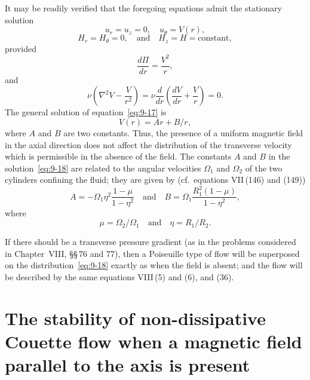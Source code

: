It may be readily verified that the foregoing equations admit the stationary solution
\begin{equation}
u_r = u_z = 0, \quad u_\theta = V(r), \label{eq:9-14}
\end{equation}
\begin{equation}
H_r = H_\theta = 0, \quad \text{and} \quad H_z = H = \text{constant}, \label{eq:9-15}
\end{equation}
provided
\begin{equation}
\frac{d\Pi}{dr} = \frac{V^2}{r}, \label{eq:9-16}
\end{equation}
and
\begin{equation}
\nu\left(\nabla^2 V - \frac{V}{r^2}\right) = \nu \frac{d}{dr}\left(\frac{dV}{dr} + \frac{V}{r}\right) = 0. \label{eq:9-17}
\end{equation}
The general solution of equation~\eqref{eq:9-17} is
\begin{equation}
V(r) = Ar + B/r, \label{eq:9-18}
\end{equation}
where $A$ and $B$ are two constants. Thus, the presence of a uniform magnetic field in the axial direction does not affect the distribution of the transverse velocity which is permissible in the absence of the field. The constants $A$ and $B$ in the solution~\eqref{eq:9-18} are related to the angular velocities $\Omega_1$ and $\Omega_2$ of the two cylinders confining the fluid; they are given by (cf.\ equations VII\,(146) and (149))
\begin{equation}
A = -\Omega_1 \eta^2 \frac{1-\mu}{1-\eta^2} \quad \text{and} \quad B = \Omega_1 \frac{R_1^2(1-\mu)}{1-\eta^2}, \label{eq:9-19}
\end{equation}
where
\begin{equation}
\mu = \Omega_2/\Omega_1 \quad \text{and} \quad \eta = R_1/R_2. \label{eq:9-20}
\end{equation}

If there should be a transverse pressure gradient (as in the problems considered in Chapter~VIII, \S\S\,76 and 77), then a Poiseuille type of flow will be superposed on the distribution~\eqref{eq:9-18} exactly as when the field is absent; and the flow will be described by the same equations VIII\,(5) and (6), and (36).

\section{The stability of non-dissipative Couette flow when a magnetic field parallel to the axis is present}
\label{sec:81}

